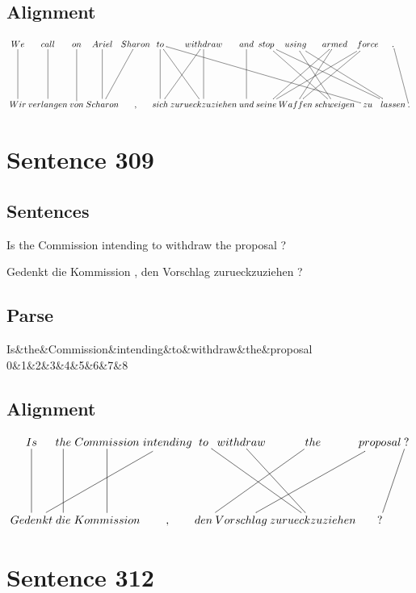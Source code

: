 \documentclass{report}
\begin{document}
\subsection*{Alignment}
\scriptsize{
$
\xymatrix@C-2.3pc{
We \ar @{-} [dd] & call \ar @{-} [dd] & on \ar @{-} [dd] & Ariel \ar @{-} [dd] & Sharon \ar @{-} [ddl] & to \ar @{-} [ddrrrrrr] \ar @{-} [ddr] \ar @{-} [dd] & withdraw \ar @{-} [dd] \ar @{-} [ddl] & and \ar @{-} [dd] & stop \ar @{-} [ddrr] \ar @{-} [ddrrrr] & using \ar @{-} [ddr] \ar @{-} [ddrrr] & armed \ar @{-} [ddll] \ar @{-} [ddl] & force \ar @{-} [ddlll] \ar @{-} [ddll] & . \ar @{-} [ddr]\\\\
Wir & verlangen & von & Scharon & , & sich & zurueckzuziehen & und & seine & Waffen & schweigen & zu & lassen & .
}$}
\newpage\section*{Sentence 309}

\subsection*{Sentences}
Is the Commission intending to withdraw the proposal ?

\noindent Gedenkt die Kommission , den Vorschlag zurueckzuziehen ?



\subsection*{Parse}
\begin{dependency}[theme=simple]
\begin{deptext}[column sep=.5cm, row sep=.1ex]
Is\&the\&Commission\&intending\&to\&withdraw\&the\&proposal\\
0\&1\&2\&3\&4\&5\&6\&7\&8\\
\end{deptext}
\end{dependency}


\subsection*{Alignment}
\scriptsize{
$
\xymatrix@C-2.3pc{
Is \ar @{-} [dd] & the \ar @{-} [dd] & Commission \ar @{-} [dd] & intending \ar @{-} [ddlll] & to \ar @{-} [ddrr] & withdraw \ar @{-} [ddr] & the \ar @{-} [ddll] & proposal \ar @{-} [ddll] & ? \ar @{-} [ddl]\\\\
Gedenkt & die & Kommission & , & den & Vorschlag & zurueckzuziehen & ?
}$}
\newpage\section*{Sentence 312}
\end{document}
